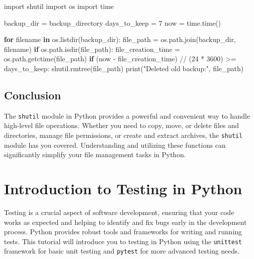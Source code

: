 \documentclass[
  letterpaper,
  DIV=11,
  numbers=noendperiod]{scrreprt}
\newenvironment{Shaded}{\begin{snugshade}}{\end{snugshade}}
\newcommand{\BuiltInTok}[1]{\textcolor[rgb]{0.00,0.23,0.31}{#1}}
\newcommand{\ControlFlowTok}[1]{\textcolor[rgb]{0.00,0.23,0.31}{\textbf{#1}}}
\newcommand{\DecValTok}[1]{\textcolor[rgb]{0.68,0.00,0.00}{#1}}
\newcommand{\ImportTok}[1]{\textcolor[rgb]{0.00,0.46,0.62}{#1}}
\newcommand{\KeywordTok}[1]{\textcolor[rgb]{0.00,0.23,0.31}{\textbf{#1}}}
\newcommand{\NormalTok}[1]{\textcolor[rgb]{0.00,0.23,0.31}{#1}}
\newcommand{\OperatorTok}[1]{\textcolor[rgb]{0.37,0.37,0.37}{#1}}
\newcommand{\StringTok}[1]{\textcolor[rgb]{0.13,0.47,0.30}{#1}}
\begin{document}
\begin{Shaded}
\begin{Highlighting}[]
\ImportTok{import}\NormalTok{ shutil}
\ImportTok{import}\NormalTok{ os}
\ImportTok{import}\NormalTok{ time}

\NormalTok{backup\_dir }\OperatorTok{=} \StringTok{\textquotesingle{}backup\_directory\textquotesingle{}}
\NormalTok{days\_to\_keep }\OperatorTok{=} \DecValTok{7}
\NormalTok{now }\OperatorTok{=}\NormalTok{ time.time()}

\ControlFlowTok{for}\NormalTok{ filename }\KeywordTok{in}\NormalTok{ os.listdir(backup\_dir):}
\NormalTok{    file\_path }\OperatorTok{=}\NormalTok{ os.path.join(backup\_dir, filename)}
    \ControlFlowTok{if}\NormalTok{ os.path.isdir(file\_path):}
\NormalTok{        file\_creation\_time }\OperatorTok{=}\NormalTok{ os.path.getctime(file\_path)}
        \ControlFlowTok{if}\NormalTok{ (now }\OperatorTok{{-}}\NormalTok{ file\_creation\_time) }\OperatorTok{//}\NormalTok{ (}\DecValTok{24} \OperatorTok{*} \DecValTok{3600}\NormalTok{) }\OperatorTok{\textgreater{}=}\NormalTok{ days\_to\_keep:}
\NormalTok{            shutil.rmtree(file\_path)}
            \BuiltInTok{print}\NormalTok{(}\StringTok{"Deleted old backup:"}\NormalTok{, file\_path)}
\end{Highlighting}
\end{Shaded}

\section{Conclusion}\label{conclusion-29}

The \texttt{shutil} module in Python provides a powerful and convenient
way to handle high-level file operations. Whether you need to copy,
move, or delete files and directories, manage file permissions, or
create and extract archives, the \texttt{shutil} module has you covered.
Understanding and utilizing these functions can significantly simplify
your file management tasks in Python.


\chapter{Introduction to Testing in
Python}\label{introduction-to-testing-in-python}

Testing is a crucial aspect of software development, ensuring that your
code works as expected and helping to identify and fix bugs early in the
development process. Python provides robust tools and frameworks for
writing and running tests. This tutorial will introduce you to testing
in Python using the \texttt{unittest} framework for basic unit testing
and \texttt{pytest} for more advanced testing needs.
\end{document}
